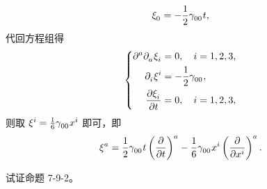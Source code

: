\begin{xiti}
\begin{zm}
\begin{equation*}
				\tensor{\xi}{_0} = - \frac{1}{2} \tensor{\gamma}{_0_0} t,
			\end{equation*}
			代回方程组得
			\begin{equation*}
				\left\{
					\begin{aligned}
						\tensor{\partial}{^a} \tensor{\partial}{_a} \tensor{\xi}{_i} &= 0 \qc i=1,2,3,\\
						\tensor{\partial}{_i} \tensor{\xi}{^i} &= - \frac{1}{2} \tensor{\gamma}{_0_0},\\
						\pdv{\tensor{\xi}{_i}}{t} &= 0 \qc i=1,2,3,
					\end{aligned}
				\right.
			\end{equation*}
			则取 $\tensor{\xi}{^i} = \frac{1}{6} \tensor{\gamma}{_0_0} x^i$ 即可，即
			\begin{equation*}
				\tensor{\xi}{^a} = \frac{1}{2} \tensor{\gamma}{_0_0} t \tensor{\left( \pdv{t} \right)}{^a} - \frac{1}{6} \tensor{\gamma}{_0_0} x^i \tensor{\left( \pdv{x^i} \right)}{^a}.
			\end{equation*}
		\end{zm}

	\item 试证命题 7-9-2。


\end{xiti}
